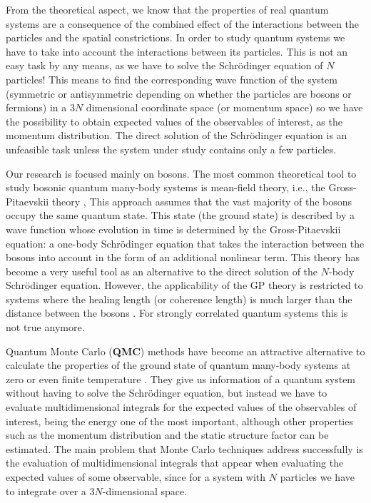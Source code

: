 From the theoretical aspect, we know that the properties of real quantum systems
are a consequence of the combined effect of the interactions between the
particles and the spatial constrictions. In order to study quantum systems we
have to take into account the interactions between its particles. This is not an
easy task by any means, as we have to solve the Schrödinger equation of $N$
particles! This means to find the corresponding wave function of the system
(symmetric or antisymmetric depending on whether the particles are bosons or
fermions) in a $3N$ dimensional coordinate space (or momentum space) so we have
the possibility to obtain expected values of the observables of interest, as the
momentum distribution. The direct solution of the Schrödinger equation is an
unfeasible task unless the system under study contains only a few particles.

Our research is focused mainly on bosons. The most common theoretical tool to
study bosonic quantum many-body systems is mean-field theory, i.e., the
Gross-Pitaevskii theory \cite{bib:gross-il-nuovo-cimento.1961,
bib:pitaevskii-jetp.1961}, This approach assumes that the vast majority of the
bosons occupy the same quantum state. This state (the ground state) is described
by a wave function whose evolution in time is determined by the Gross-Pitaevskii
equation: a one-body Schrödinger equation that takes the interaction between the
bosons into account in the form of an additional nonlinear term. This theory has
become a very useful tool as an alternative to the direct solution of the
$N$-body Schrödinger equation. However, the applicability of the GP theory is
restricted to systems where the healing length (or coherence length) is much
larger than the distance between the bosons
\cite{bib:pitaevskii-rev-mod-phys.71.463.1999}. For strongly correlated quantum
systems this is not true anymore.

Quantum Monte Carlo ({\textbf{QMC}}) methods have become an attractive
alternative to calculate the properties of the ground state of quantum many-body
systems at zero or even finite temperature
\cite{bib:ceperley-rev-min-geochem.1.2010}. They give us information of a
quantum system without having to solve the Schrödinger equation, but instead we
have to evaluate multidimensional integrals for the expected values of the
observables of interest, being the energy one of the most important, although
other properties such as the momentum distribution and the static structure
factor can be estimated. The main problem that Monte Carlo techniques address
successfully is the evaluation of multidimensional integrals that appear when
evaluating the expected values of some observable, since for a system with $N$
particles we have to integrate over a $3N$-dimensional space.

